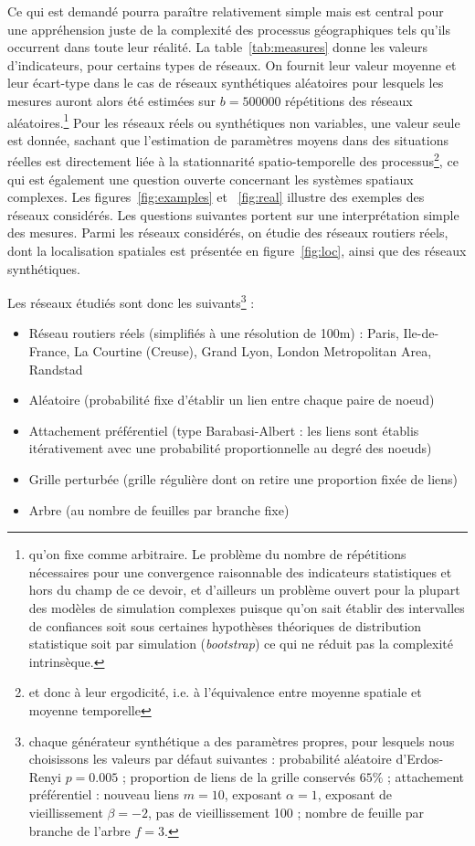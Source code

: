 Ce qui est demandé pourra paraître relativement simple mais est central pour une appréhension juste de la complexité des processus géographiques tels qu'ils occurrent dans toute leur réalité. La table~\ref{tab:measures} donne les valeurs d'indicateurs, pour certains types de réseaux. On fournit leur valeur moyenne et leur écart-type dans le cas de réseaux synthétiques aléatoires pour lesquels les mesures auront alors été estimées sur $b=500000$ répétitions des réseaux aléatoires.\footnote{qu'on fixe comme arbitraire. Le problème du nombre de répétitions nécessaires pour une convergence raisonnable des indicateurs statistiques et hors du champ de ce devoir, et d'ailleurs un problème ouvert pour la plupart des modèles de simulation complexes puisque qu'on sait établir des intervalles de confiances soit sous certaines hypothèses théoriques de distribution statistique soit par simulation (\emph{bootstrap}) ce qui ne réduit pas la complexité intrinsèque.} Pour les réseaux réels ou synthétiques non variables, une valeur seule est donnée, sachant que l'estimation de paramètres moyens dans des situations réelles est directement liée à la stationnarité spatio-temporelle des processus\footnote{et donc à leur ergodicité, i.e. à l'équivalence entre moyenne spatiale et moyenne temporelle}, ce qui est également une question ouverte concernant les systèmes spatiaux complexes. Les figures~\ref{fig:examples} et ~\ref{fig:real} illustre des exemples des réseaux considérés. Les questions suivantes portent sur une interprétation simple des mesures. Parmi les réseaux considérés, on étudie des réseaux routiers réels, dont la localisation spatiales est présentée en figure~\ref{fig:loc}, ainsi que des réseaux synthétiques.

Les réseaux étudiés sont donc les suivants\footnote{chaque générateur synthétique a des paramètres propres, pour lesquels nous choisissons les valeurs par défaut suivantes : probabilité aléatoire d'Erdos-Renyi $p=0.005$ ; proportion de liens de la grille conservés $65\%$ ; attachement préférentiel : nouveau liens $m=10$, exposant $\alpha=1$, exposant de vieillissement $\beta = -2$, pas de vieillissement 100 ; nombre de feuille par branche de l'arbre $f=3$.} : 
\begin{itemize}
\item Réseau routiers réels (simplifiés à une résolution de 100m) : Paris, Ile-de-France, La Courtine (Creuse), Grand Lyon, London Metropolitan Area, Randstad
\item Aléatoire (probabilité fixe d'établir un lien entre chaque paire de noeud)
\item Attachement préférentiel (type Barabasi-Albert : les liens sont établis itérativement avec une probabilité proportionnelle au degré des noeuds)
\item Grille perturbée (grille régulière dont on retire une proportion fixée de liens)
\item Arbre (au nombre de feuilles par branche fixe)
\end{itemize}

